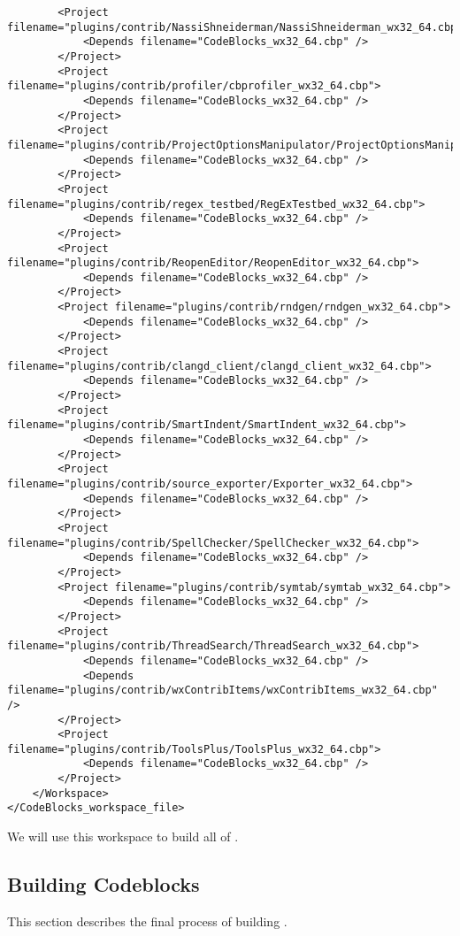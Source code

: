 {\begin{verbatim}
		<Project filename="plugins/contrib/NassiShneiderman/NassiShneiderman_wx32_64.cbp">
			<Depends filename="CodeBlocks_wx32_64.cbp" />
		</Project>
		<Project filename="plugins/contrib/profiler/cbprofiler_wx32_64.cbp">
			<Depends filename="CodeBlocks_wx32_64.cbp" />
		</Project>
		<Project filename="plugins/contrib/ProjectOptionsManipulator/ProjectOptionsManipulator_wx32_64.cbp">
			<Depends filename="CodeBlocks_wx32_64.cbp" />
		</Project>
		<Project filename="plugins/contrib/regex_testbed/RegExTestbed_wx32_64.cbp">
			<Depends filename="CodeBlocks_wx32_64.cbp" />
		</Project>
		<Project filename="plugins/contrib/ReopenEditor/ReopenEditor_wx32_64.cbp">
			<Depends filename="CodeBlocks_wx32_64.cbp" />
		</Project>
		<Project filename="plugins/contrib/rndgen/rndgen_wx32_64.cbp">
			<Depends filename="CodeBlocks_wx32_64.cbp" />
		</Project>
		<Project filename="plugins/contrib/clangd_client/clangd_client_wx32_64.cbp">
			<Depends filename="CodeBlocks_wx32_64.cbp" />
		</Project>
		<Project filename="plugins/contrib/SmartIndent/SmartIndent_wx32_64.cbp">
			<Depends filename="CodeBlocks_wx32_64.cbp" />
		</Project>
		<Project filename="plugins/contrib/source_exporter/Exporter_wx32_64.cbp">
			<Depends filename="CodeBlocks_wx32_64.cbp" />
		</Project>
		<Project filename="plugins/contrib/SpellChecker/SpellChecker_wx32_64.cbp">
			<Depends filename="CodeBlocks_wx32_64.cbp" />
		</Project>
		<Project filename="plugins/contrib/symtab/symtab_wx32_64.cbp">
			<Depends filename="CodeBlocks_wx32_64.cbp" />
		</Project>
		<Project filename="plugins/contrib/ThreadSearch/ThreadSearch_wx32_64.cbp">
			<Depends filename="CodeBlocks_wx32_64.cbp" />
			<Depends filename="plugins/contrib/wxContribItems/wxContribItems_wx32_64.cbp" />
		</Project>
		<Project filename="plugins/contrib/ToolsPlus/ToolsPlus_wx32_64.cbp">
			<Depends filename="CodeBlocks_wx32_64.cbp" />
		</Project>
	</Workspace>
</CodeBlocks_workspace_file>
\end{verbatim}
}


We will use this workspace to build all of \codeblocks. 


\subsection{Building Codeblocks}

This section describes the final process of building \codeblocks.

